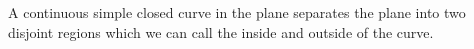 A continuous simple closed curve in the plane separates 
the plane into two disjoint regions which we can call the 
inside and outside of the curve.